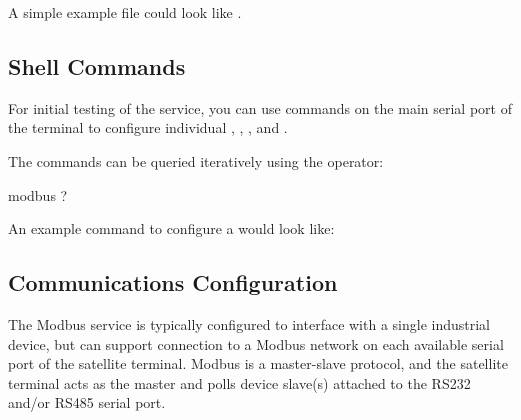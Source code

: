 \documentclass[letterpaper,10pt,english]{sphinxmanual}
\begin{document}
A simple example  file could look like {\hyperref[\detokenize{usage:example-config-dat}]{}}.


\subsection{Shell Commands}
\label{\detokenize{configuration:shell-commands}}
For initial testing of the service, you can use  commands on the main serial port of the terminal to configure individual , , ,  and .

The  commands can be queried iteratively using the  operator:

%
\begin{sphinxVerbatim}[commandchars=\\\{\}]
modbus ?
\end{sphinxVerbatim}

An example  command to configure a  would look like:

%
\begin{sphinxVerbatim}[commandchars=\\\{\}]
        
\end{sphinxVerbatim}


\subsection{Communications Configuration}
\label{\detokenize{configuration:communications-configuration}}
The Modbus service is typically configured to interface with a single industrial device, but can support connection to a Modbus network on each available serial port of the satellite terminal.  Modbus is a master-slave protocol, and the satellite terminal acts as the master and polls device slave(s) attached to the RS232 and/or RS485 serial port.
\end{document}
